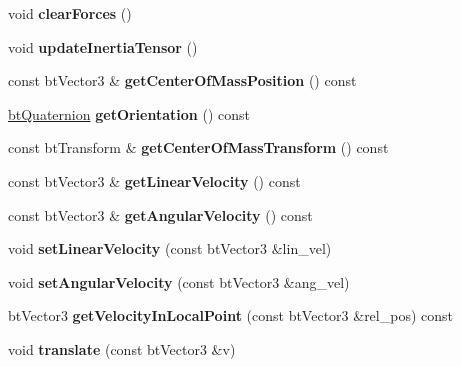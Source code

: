 \begin{DoxyCompactItemize}
void {\bfseries clear\+Forces} ()
\item 
\mbox{\label{classbtRigidBody_aeb2880f17187c3f28b4a253423aa71d1}} 
void {\bfseries update\+Inertia\+Tensor} ()
\item 
\mbox{\label{classbtRigidBody_aadd4ef35ebe3633314d04f09f91699ed}} 
const bt\+Vector3 \& {\bfseries get\+Center\+Of\+Mass\+Position} () const
\item 
\mbox{\label{classbtRigidBody_a6d50e07777d473368d189cba7850a798}} 
\hyperlink{classbtQuaternion}{bt\+Quaternion} {\bfseries get\+Orientation} () const
\item 
\mbox{\label{classbtRigidBody_a999bf363587ede881dbe239e7d1e9bee}} 
const bt\+Transform \& {\bfseries get\+Center\+Of\+Mass\+Transform} () const
\item 
\mbox{\label{classbtRigidBody_a9a8c37d20a73d197e55a0a5ccc342815}} 
const bt\+Vector3 \& {\bfseries get\+Linear\+Velocity} () const
\item 
\mbox{\label{classbtRigidBody_a0f6b08909d7eab1fc105608b10fe4b90}} 
const bt\+Vector3 \& {\bfseries get\+Angular\+Velocity} () const
\item 
\mbox{\label{classbtRigidBody_ad692042edc901425189cf1d067eebac6}} 
void {\bfseries set\+Linear\+Velocity} (const bt\+Vector3 \&lin\+\_\+vel)
\item 
\mbox{\label{classbtRigidBody_ac6e5f94e998150e37ca8962c851d10a8}} 
void {\bfseries set\+Angular\+Velocity} (const bt\+Vector3 \&ang\+\_\+vel)
\item 
\mbox{\label{classbtRigidBody_a1b4cd79f5c8ad9161737742eea9470f5}} 
bt\+Vector3 {\bfseries get\+Velocity\+In\+Local\+Point} (const bt\+Vector3 \&rel\+\_\+pos) const
\item 
\mbox{\label{classbtRigidBody_aca945f8e257b617c5600e809f179a0bb}} 
void {\bfseries translate} (const bt\+Vector3 \&v)
\item 
\mbox{\label{classbtRigidBody_a00efe4219a990718835e0a7ada5a2b5d}} 

\end{DoxyCompactItemize}
